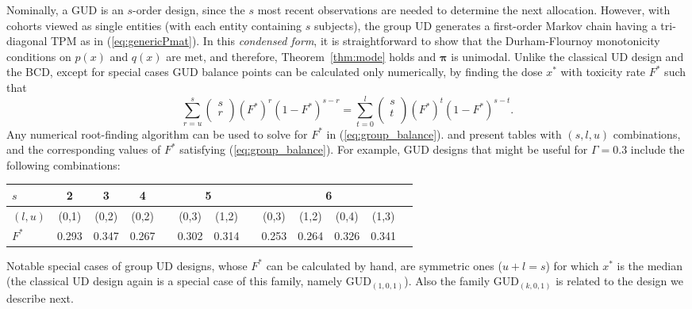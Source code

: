 Nominally, a GUD is an $s$-order design, since the $s$ most recent observations are needed to determine the next allocation. However, with cohorts viewed as single entities (with each entity containing $s$ subjects), the group UD generates a first-order Markov chain having a tri-diagonal TPM as in (\ref{eq:genericPmat}). In this \emph{condensed form}, it is straightforward to show that the Durham-Flournoy monotonicity conditions on $p(x)$ and $q(x)$ are met, and therefore, Theorem~\ref{thm:mode} holds and $\boldsymbol{\pi}$ is unimodal.   Unlike the classical UD design and the BCD, except for special cases GUD balance points can be calculated only numerically, by finding the dose $x^*$ with toxicity rate $F^*$ such that
%
\begin{equation}\label{eq:group_balance}
\sum_{r=u}^s
\left(\begin{array}{c}
s\\
r\\
\end{array}\right) \left(F^*\right)^r(1-F^*)^{s-r}=
\sum_{t=0}^{l}
\left(\begin{array}{c}
s\\
t\\
\end{array}\right) \left(F^*\right)^t(1-F^*)^{s-t}.
\end{equation}
%
Any numerical root-finding algorithm can be used to solve for $F^*$ in (\ref{eq:group_balance}). \cite{Gezm:Flou:Grou:2006} and \cite{Ivan:Flou:Chun:Cumu:2007} present tables with $(s,l,u)$ combinations, and the corresponding values of $F^*$ satisfying (\ref{eq:group_balance}). For example, GUD designs that might be useful for $\Gamma=0.3$ include the following combinations:

\begin{center}
\begin{small}
\begin{tabular}{lcccccccccccc}
\toprule
$s$ & 2 & 3 & 4 & & \multicolumn{2}{c}{5} &  &   \multicolumn{4}{c}{6} \\
\midrule
$(l,u)$ & (0,1)& (0,2)& (0,2)& & (0,3)& (1,2) & &  (0,3)& (1,2) &  (0,4)& (1,3) \\
$F^*$ & 0.293 &  0.347 & 0.267 & & 0.302 & 0.314  & & 0.253 & 0.264 & 0.326 & 0.341\\
\bottomrule
\end{tabular}
\end{small}
\end{center}

Notable special cases of group UD designs, whose $F^*$ can be calculated by hand, are symmetric ones ($u+l=s$) for which $x^*$ is the median (the classical UD design again is a special case of this family, namely GUD$_{(1,0,1)}$). Also the family GUD$_{(k,0,1)}$ is related to the design we describe next.

